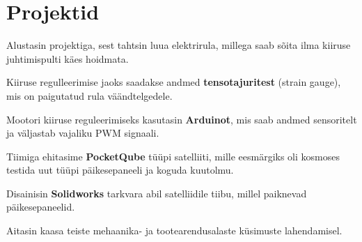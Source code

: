 \documentclass[letterpaper]{deedy-resume} %
\begin{document}
\begin{minipage}[t]{0.66\textwidth}
\section{Projektid}

%
%




\begin{tightitemize}
\item Alustasin projektiga, sest tahtsin luua elektrirula, millega saab sõita ilma kiiruse juhtimispulti käes hoidmata.
\item Kiiruse regulleerimise jaoks saadakse andmed \textbf{tensotajuritest} (strain gauge), mis on paigutatud rula väändtelgedele.
\item Mootori kiiruse reguleerimiseks kasutasin \textbf{Arduinot}, mis saab andmed sensoritelt ja väljastab vajaliku PWM signaali.
\end{tightitemize}

\sectionspace %



\begin{tightitemize}
\item Tiimiga ehitasime \textbf{PocketQube} tüüpi satelliiti, mille eesmärgiks oli kosmoses testida uut tüüpi päikesepaneeli ja koguda kuutolmu.
\item Disainisin \textbf{Solidworks} tarkvara abil satelliidile tiibu, millel paiknevad päikesepaneelid.
\item Aitasin kaasa teiste mehaanika- ja tootearendusalaste küsimuste lahendamisel.
\end{tightitemize}


\end{minipage}
\end{document}

